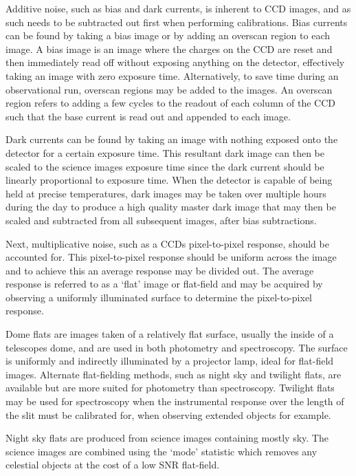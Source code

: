 Additive noise, such as bias and dark currents, is inherent to \gls{CCD} images, and as such needs to be subtracted out first when performing calibrations.
Bias currents can be found by taking a bias image or by adding an overscan region to each image.
A bias image is an image where the charges on the \gls{CCD} are reset and then immediately read off without exposing anything on the detector, effectively taking an image with zero exposure time.
Alternatively, to save time during an observational run, overscan regions may be added to the images.
An overscan region refers to adding a few cycles to the readout of each column of the \gls{CCD} such that the base current is read out and appended to each image.

Dark currents can be found by taking an image with nothing exposed onto the detector for a certain exposure time.
This resultant dark image can then be scaled to the science images exposure time since the dark current should be linearly proportional to exposure time.
When the detector is capable of being held at precise temperatures, dark images may be taken over multiple hours during the day to produce a high quality master dark image that may then be scaled and subtracted from all subsequent images, after bias subtractions.

Next, multiplicative noise, such as a \gls{CCD}s pixel-to-pixel response, should be accounted for.
This pixel-to-pixel response should be uniform across the image and to achieve this an average response may be divided out.
The average response is referred to as a `flat' image or flat-field and may be acquired by observing a uniformly illuminated surface to determine the pixel-to-pixel response.

\pagebreak

Dome flats are images taken of a relatively flat surface, usually the inside of a telescopes dome, and are used in both photometry and spectroscopy.
The surface is uniformly and indirectly illuminated by a projector lamp, ideal for flat-field images.
Alternate flat-fielding methods, such as night sky and twilight flats, are available but are more suited for photometry than spectroscopy.
Twilight flats may be used for spectroscopy when the instrumental response over the length of the slit must be calibrated for, when observing extended objects for example.

Night sky flats are produced from science images containing mostly sky.
The science images are combined using the `mode' statistic which removes any celestial objects at the cost of a low \gls{SNR} flat-field.

